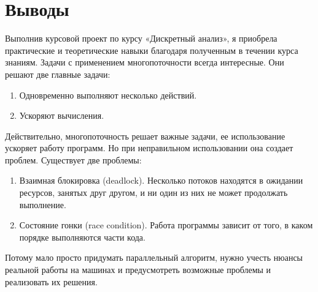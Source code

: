 \pagebreak
\section{Выводы}
Выполнив курсовой проект по курсу «Дискретный анализ», я приобрела практические и теоретические навыки благодаря полученным в течении курса знаниям. Задачи с применением многопоточности всегда интересные. Они решают две главные задачи:
\begin{enumerate}
	\item Одновременно выполняют несколько действий.
	\item Ускоряют вычисления.
\end{enumerate}
Действительно, многопоточность решает важные задачи, ее использование ускоряет работу программ. Но при неправильном использовании она создает проблем. Существует две проблемы:
\begin{enumerate}
	\item Взаимная блокировка (deadlock). Несколько потоков находятся в ожидании ресурсов, занятых друг другом, и ни один из них не может продолжать выполнение.
	\item Состояние гонки (race condition). Работа программы зависит от того, в каком порядке выполняются части кода.
\end{enumerate}
Потому мало просто придумать параллельный алгоритм, нужно учесть нюансы реальной работы на машинах и предусмотреть возможные проблемы и реализовать их решения.
\pagebreak
